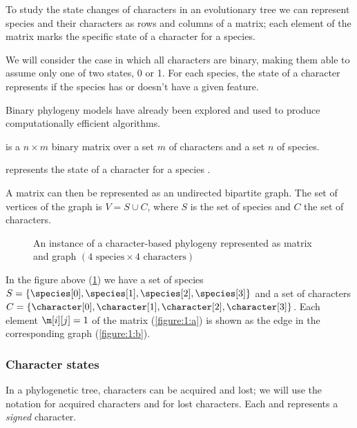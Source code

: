 To study the state changes of characters in an evolutionary tree we can represent species and their characters as rows and columns of a matrix; each element of the matrix marks the specific state of a character for a species.

We will consider the case in which all characters are binary, making them able to assume only one of two states, 0 or 1.
For each species, the state of a character represents if the species has or doesn't have a given feature.

Binary phylogeny models have already been explored \cite{PPPbin2012, NPP2007, IDPP2004} and used to produce computationally efficient algorithms.

\begin{definition}\label{definition:m}
  \m{} is a $n \times m$ binary matrix over a set $m$ of characters and a set $n$ of species.

  \m[i][j] represents the state of a character \character[j] for a species \species[i].
\end{definition}

A matrix \m{} can then be represented as an undirected bipartite graph.
The set of vertices of the graph is $V = S \cup C$, where $S$ is the set of species and $C$ the set of characters.

\begin{figure}[ht]
  

  \caption{An instance of a character-based phylogeny represented as matrix and graph $(\text{4 species} \times \text{4 characters})$}\label{figure:1}
\end{figure}

In the figure above (\ref{figure:1}) we have a set of species $S = \{ \species[0], \species[1], \species[2], \species[3] \}$ and a set of characters $C = \{ \character[0], \character[1], \character[2], \character[3] \}$.
Each element $\m[i][j] = 1$ of the matrix (\ref{figure:1:a}) is shown as the edge \edge{\species[i]}{\character[j]} in the corresponding graph (\ref{figure:1:b}).

\subsubsection{Character states}\label{section:character-states}

In a phylogenetic tree, characters can be acquired and lost; we will use the notation \character[][+] for acquired characters and \character[][-] for lost characters.
Each \character[][+] and \character[][-] represents a \emph{signed} character.

